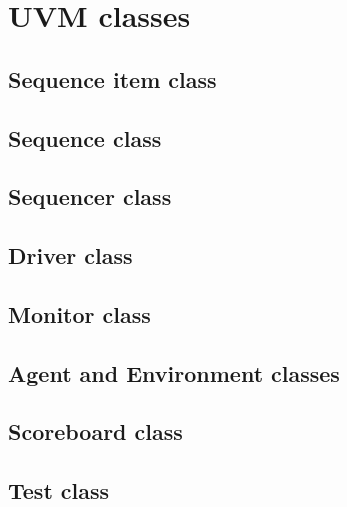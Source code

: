 \chapter{UVM classes}
\label{appendix14}

\section{Sequence item class}
	
\newpage
\section{Sequence class }
	
\newpage	
	\section{Sequencer class }
	
\newpage	
		\section{Driver class }
	
\newpage	
		\section{Monitor class }
	
\newpage	
	\section{Agent and Environment classes }
	
\newpage
\section{Scoreboard class}
		
\newpage
\section{Test class}		

